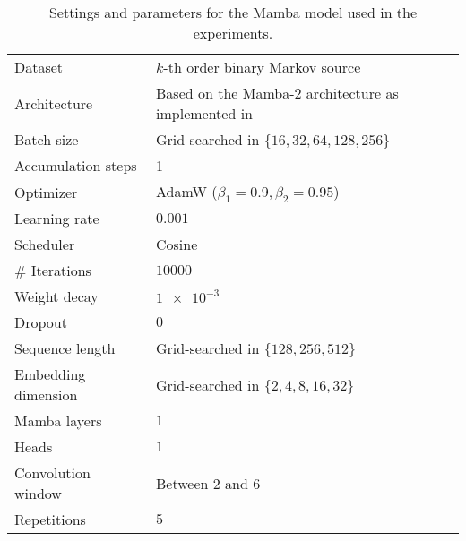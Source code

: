 \begin{table}[h]
\caption{Settings and parameters for the Mamba model used in the experiments.}
\label{tab:mamba-setup}
\vspace{1mm}
\small%
\begin{tabularx}{\linewidth}{lX}
    \toprule
    Dataset & $k$-th order binary Markov source \\
    Architecture & Based on the Mamba-2 architecture as implemented in \cite{dao2024transformers} \\
    \midrule
    Batch size & Grid-searched in $\{16, 32, 64, 128, 256\}$ \\
    Accumulation steps & 1 \\
    \midrule
    Optimizer & AdamW ($\beta_1 = 0.9, \beta_2 = 0.95$) \\
    Learning rate & $0.001$ \\
    Scheduler & Cosine \\
    \# Iterations & $10000$ \\
    Weight decay & $\num{1e-3}$\\
    \midrule
    Dropout & $0$ \\
    Sequence length & Grid-searched in $\{128, 256, 512\}$ \\
    Embedding dimension & Grid-searched in $\{2,4,8,16,32\}$ \\
    Mamba layers & $1$ \\
    Heads & $1$ \\
    Convolution window & Between $2$ and $6$ \\
    \midrule
    Repetitions & $5$\\
    \bottomrule
\end{tabularx}
\end{table}

